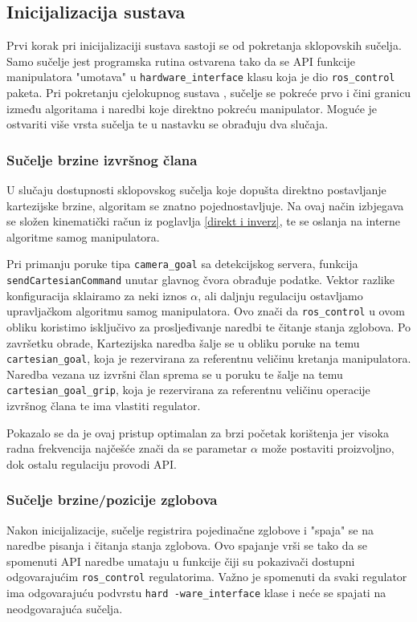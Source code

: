 \documentclass[times, utf8, diplomski, numeric]{fer}
\begin{document}
\subsection{Inicijalizacija sustava}
Prvi korak pri inicijalizaciji sustava sastoji se od pokretanja sklopovskih sučelja.
Samo sučelje jest programska rutina ostvarena tako da se API funkcije manipulatora "umotava" u \texttt{hardware\_interface} klasu koja je dio \texttt{ros\_control} paketa.
Pri pokretanju cjelokupnog sustava , sučelje se pokreće prvo i čini granicu između algoritama i naredbi koje direktno pokreću manipulator.
Moguće je ostvariti više vrsta sučelja te u nastavku se obrađuju dva slučaja.

\subsubsection{Sučelje brzine izvršnog člana}
U slučaju dostupnosti sklopovskog sučelja koje dopušta direktno postavljanje kartezijske brzine, algoritam se znatno pojednostavljuje.
Na ovaj način izbjegava se složen kinematički račun iz poglavlja \ref{direkt i inverz}, te se oslanja na interne algoritme samog manipulatora.

Pri primanju poruke tipa \texttt{camera\_goal} sa detekcijskog servera, funkcija \\  \texttt{sendCartesianCommand} unutar glavnog čvora obrađuje podatke. 
Vektor razlike konfiguracija sklairamo za neki iznos $\alpha$, ali daljnju regulaciju ostavljamo upravljačkom algoritmu samog manipulatora.
Ovo znači da \texttt{ros\_control} u ovom obliku koristimo isključivo za prosljeđivanje naredbi te čitanje stanja zglobova.
Po završetku obrade, Kartezijska naredba šalje se u obliku poruke na temu \texttt{cartesian\_goal}, koja je rezervirana za referentnu veličinu kretanja manipulatora.
Naredba vezana uz izvršni član sprema se u poruku te šalje na temu \texttt{cartesian\_goal\_grip}, koja je rezervirana za referentnu veličinu operacije izvršnog člana te ima vlastiti regulator.

Pokazalo se da je ovaj pristup optimalan za brzi početak korištenja jer visoka radna frekvencija najčešće znači da se parametar $\alpha$ može postaviti proizvoljno, dok ostalu regulaciju provodi API.

\subsubsection{Sučelje brzine/pozicije zglobova}
Nakon inicijalizacije, sučelje registrira pojedinačne zglobove i "spaja" se na naredbe pisanja i čitanja stanja zglobova.
Ovo spajanje vrši se tako da se spomenuti API naredbe umataju u funkcije čiji su pokazivači dostupni  odgovarajućim \texttt{ros\_control} regulatorima.
Važno je spomenuti da svaki regulator ima odgovarajuću podvrstu \texttt{hard -ware\_interface} klase i neće se spajati na neodgovarajuća sučelja.
\end{document}
